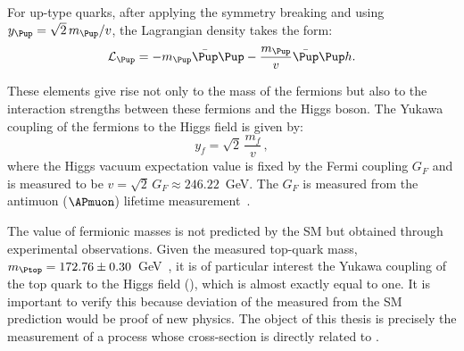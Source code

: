 For up-type quarks, after applying the symmetry breaking and using $y_{\Pup}=\sqrt{2}\,m_{\Pup}/v$, the Lagrangian density takes the form:
\begin{equation*}%
\mathcal{L}_{\Pup} = -m_{\Pup} \bar{\Pup}\Pup - \frac{m_{\Pup}}{v}\bar{\Pup}\Pup h .
\end{equation*}

These elements give rise not only to the mass of the fermions but also to the interaction
strengths between these fermions and the Higgs boson. The Yukawa coupling of the fermions to the Higgs field is given by:
\begin{equation}\label{eq:chap1:HiggsMechanism:YukawaCoupling}
	y_{f} = \sqrt{2} \, \frac{m_{f}}{v} \, ,
\end{equation}
where the Higgs vacuum expectation value is fixed by the Fermi coupling $G_{F}$ and is measured to be $v = \sqrt{2}\,G_{F} \approx 246.22$~GeV. The $G_{F}$ 
is measured from the antimuon ($\APmuon$) lifetime measurement~\cite{MuLan:2010shf}. 

The value of fermionic masses is not predicted by the SM but obtained through experimental observations.
Given the measured top-quark mass, $\mtop = 172.76 \pm 0.30$~GeV~\cite{Workman:2022ynf}, it is of particular interest the Yukawa coupling of the top quark to the Higgs field (\yt), which is almost exactly equal to one. %
 It is important to verify this because deviation of the measured \yt from the SM prediction would be proof of new physics.
 The object of this thesis is precisely the measurement of a process whose cross-section is directly related to \yt.


